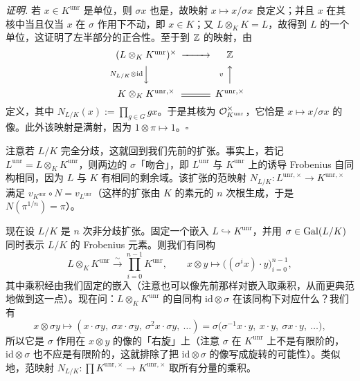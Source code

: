 \textit{证明.} 若 $x\in K^{\mathrm{unr}}$ 是单位，则 $\sigma x$ 也是，故映射 $x\mapsto x/\sigma x$ 良定义；并且 $x$ 在其核中当且仅当 $x$ 在 $\sigma$ 作用下不动，即 $x\in K$；又 $L\otimes_{K}K=L$，故得到 $L$ 的一个单位，这证明了左半部分的正合性。至于到 $\mathbb{Z}$ 的映射，由
\[
\begin{CD}
(L\otimes_{K}K^{\mathrm{unr}})^{\times} @>>> \Z\\
@V{N_{L/K}\otimes\operatorname{id}}VV @A{\ v\ }AA\\
K\otimes_{K}K^{\mathrm{unr},\times} @= K^{\mathrm{unr},\times}
\end{CD}
\]
定义，其中 $N_{L/K}(x):=\prod_{g\in G}gx$。于是其核为 $\mathcal{O}_{K^{\mathrm{unr}}}^{\times}$，它恰是 $x\mapsto x/\sigma x$ 的像。此外该映射是满射，因为 $1\otimes\pi\mapsto 1$。\hfill$\square$

注意若 $L/K$ 完全分歧，这就回到我们先前的扩张。事实上，若记 $L^{\mathrm{unr}}=L\otimes_{K}K^{\mathrm{unr}}$，则两边的 $\sigma$「吻合」，即 $L^{\mathrm{unr}}$ 与 $K^{\mathrm{unr}}$ 上的诱导 Frobenius 自同构相同，因为 $L$ 与 $K$ 有相同的剩余域。该扩张的范映射 $N_{L/K}\colon L^{\mathrm{unr},\times}\to K^{\mathrm{unr},\times}$ 满足 $v_{K^{\mathrm{unr}}}\circ N=v_{L^{\mathrm{unr}}}$（这样的扩张由 $K$ 的素元的 $n$ 次根生成，于是 $N(\pi^{1/n})=\pi$）。

现在设 $L/K$ 是 $n$ 次非分歧扩张。固定一个嵌入 $L\hookrightarrow K^{\mathrm{unr}}$，并用 $\sigma\in\operatorname{Gal}(L/K)$ 同时表示 $L/K$ 的 Frobenius 元素。则我们有同构
\[
L\otimes_{K}K^{\mathrm{unr}}\xrightarrow{\ \sim\ }\prod_{i=0}^{n-1}K^{\mathrm{unr}},\qquad x\otimes y\mapsto\bigl((\sigma^{i}x)\cdot y\bigr)_{i=0}^{n-1},
\]
其中乘积经由我们固定的嵌入（注意也可以像先前那样对嵌入取乘积，从而更典范地做到这一点）。现在问：$L\otimes_{K}K^{\mathrm{unr}}$ 的自同构 $\mathrm{id}\otimes\sigma$ 在该同构下对应什么？我们有
\[
x\otimes\sigma y\mapsto(x\cdot\sigma y,\ \sigma x\cdot\sigma y,\ \sigma^{2}x\cdot\sigma y,\ \dots)=\sigma\bigl(\sigma^{-1}x\cdot y,\ x\cdot y,\ \sigma x\cdot y,\ \dots\bigr),
\]
所以它是 $\sigma$ 作用在 $x\otimes y$ 的像的「右旋」上（注意 $\sigma$ 在 $K^{\mathrm{unr}}$ 上不是有限阶的，$\mathrm{id}\otimes\sigma$ 也不应是有限阶的，这就排除了把 $\mathrm{id}\otimes\sigma$ 的像写成旋转的可能性）。类似地，范映射 $N_{L/K}\colon\prod K^{\mathrm{unr},\times}\to K^{\mathrm{unr},\times}$ 取所有分量的乘积。

